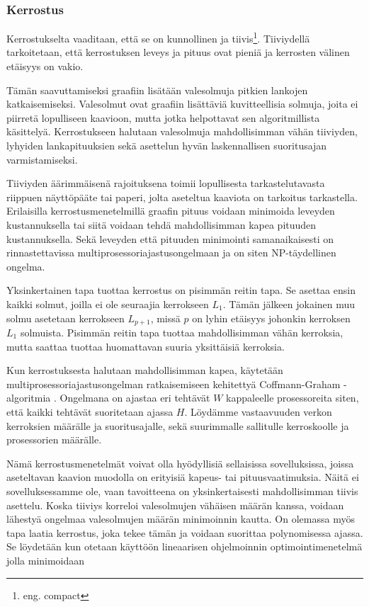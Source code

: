 \documentclass[finnish,12pt]{article}
\begin{document}
		\subsubsection{Kerrostus}

Kerrostukselta vaaditaan, että se on kunnollinen ja tiivis\footnote{eng. compact}.
Tiiviydellä tarkoitetaan, että kerrostuksen leveys ja pituus ovat pieniä ja kerrosten välinen etäisyys on vakio. 

Tämän saavuttamiseksi graafiin lisätään valesolmuja pitkien lankojen katkaisemiseksi.
Valesolmut ovat graafiin lisättäviä kuvitteellisia solmuja, joita ei piirretä lopulliseen kaavioon, mutta jotka helpottavat sen algoritmillista käsittelyä.
Kerrostukseen halutaan valesolmuja mahdollisimman vähän tiiviyden, lyhyiden lankapituuksien sekä asettelun hyvän laskennallisen suoritusajan varmistamiseksi.

Tiiviyden äärimmäisenä rajoituksena toimii lopullisesta tarkastelutavasta riippuen näyttöpääte tai paperi, jolta aseteltua kaaviota on tarkoitus tarkastella.
Erilaisilla kerrostusmenetelmillä graafin pituus voidaan minimoida leveyden kustannuksella tai siitä voidaan tehdä mahdollisimman kapea pituuden kustannuksella.
Sekä leveyden että pituuden minimointi samanaikaisesti on rinnastettavissa multiprosessoriajastusongelmaan ja on siten NP-täydellinen ongelma. \cite{RefWorks:39}

Yksinkertainen tapa tuottaa kerrostus on pisimmän reitin tapa.
Se asettaa ensin kaikki solmut, joilla ei ole seuraajia kerrokseen $L_1$.
Tämän jälkeen jokainen muu solmu asetetaan kerrokseen $L_{p+1}$, missä $p$ on lyhin etäisyys johonkin kerroksen $L_1$ solmuista.
Pisimmän reitin tapa tuottaa mahdollisimman vähän kerroksia, mutta saattaa tuottaa huomattavan suuria yksittäisiä kerroksia.

Kun kerrostuksesta halutaan mahdollisimman kapea, käytetään multiprosessoriajastusongelman ratkaisemiseen kehitettyä Coffmann-Graham -algoritmia \cite{RefWorks:59}.
Ongelmana on ajastaa eri tehtävät $W$ kappaleelle prosessoreita siten, että kaikki tehtävät suoritetaan ajassa $H$.
Löydämme vastaavuuden verkon kerroksien määrälle ja suoritusajalle, sekä suurimmalle sallitulle kerroskoolle ja prosessorien määrälle.

Nämä kerrostusmenetelmät voivat olla hyödyllisiä sellaisissa sovelluksissa, joissa aseteltavan kaavion muodolla on erityisiä kapeus- tai pituusvaatimuksia.
Näitä ei sovelluksessamme ole, vaan tavoitteena on yksinkertaisesti mahdollisimman tiivis asettelu.
Koska tiiviys korreloi valesolmujen vähäisen määrän kanssa, voidaan lähestyä ongelmaa valesolmujen määrän minimoinnin kautta.
On olemassa myös tapa laatia kerrostus, joka tekee tämän ja voidaan suorittaa polynomisessa ajassa.
Se löydetään kun otetaan käyttöön lineaarisen ohjelmoinnin optimointimenetelmä jolla minimoidaan
\end{document}
